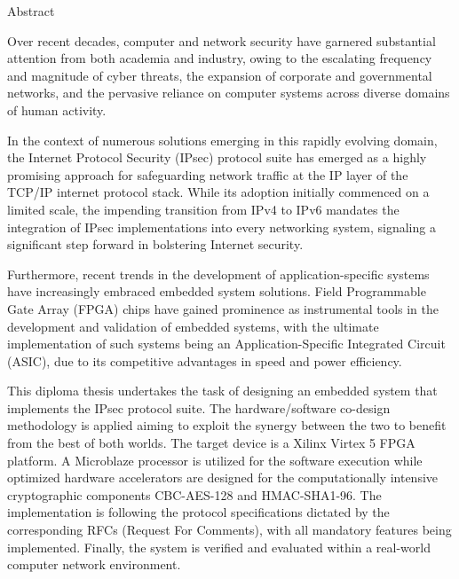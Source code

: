 
\pagestyle{plain}
\begin{center}
{\LARGE Abstract}\\[1cm]
\end{center}

\noindent
Over recent decades, computer and network security have garnered substantial attention from both academia and industry, owing to the escalating frequency and magnitude of cyber threats, the expansion of corporate and governmental networks, and the pervasive reliance on computer systems across diverse domains of human activity.

In the context of numerous solutions emerging in this rapidly evolving domain, the Internet Protocol Security (IPsec) protocol suite has emerged as a highly promising approach for safeguarding network traffic at the IP layer of the TCP/IP internet protocol stack. While its adoption initially commenced on a limited scale, the impending transition from IPv4 to IPv6 mandates the integration of IPsec implementations into every networking system, signaling a significant step forward in bolstering Internet security.

Furthermore, recent trends in the development of application-specific systems have increasingly embraced embedded system solutions. Field Programmable Gate Array (FPGA) chips have gained prominence as instrumental tools in the development and validation of embedded systems, with the ultimate implementation of such systems being an Application-Specific Integrated Circuit (ASIC), due to its competitive advantages in speed and power efficiency.

This diploma thesis undertakes the task of designing an embedded system that implements the IPsec protocol suite. The hardware/software co-design methodology is applied aiming to exploit the synergy between the two to benefit from the best of both worlds. The target device is a Xilinx Virtex 5 FPGA platform. A Microblaze processor is utilized for the software execution while optimized hardware accelerators are designed for the computationally intensive cryptographic components CBC-AES-128 and HMAC-SHA1-96. The implementation is following the protocol specifications dictated by the corresponding RFCs (Request For Comments), with all mandatory features being implemented. Finally, the system is verified and evaluated within a real-world computer network environment.

